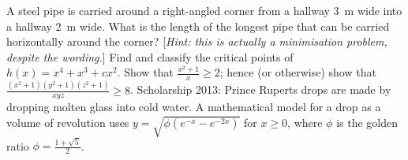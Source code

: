 \begin{questions}
  \questioE A steel pipe is carried around a right-angled corner from a hallway \SI{3}{\metre} wide into a hallway \SI{2}{\metre}
            wide. What is the length of the longest pipe that can be carried horizontally around the corner? [\textit{Hint: this is actually
            a minimisation problem, despite the wording.}]
  \questioE Find and classify the critical points of $ h(x) = x^4 + x^3 + cx^2 $.
  \questioS Show that $ \frac{x^2 + 1}{x} \geq 2 $; hence (or otherwise) show that $ \frac{(x^2 + 1)(y^2 + 1)(z^2 + 1)}{xyz} \geq 8 $.
  \questioS Scholarship 2013: Prince Ruperts drops are made by dropping molten glass into cold water. A mathematical model for a drop
            as a volume of revolution uses $ y = \sqrt{\phi (e^{-x} - e^{-2x})} $ for $ x \geq 0 $, where $ \phi $ is the golden
            ratio $ \phi = \frac{1 + \sqrt{5}}{2} $.

\end{questions}

